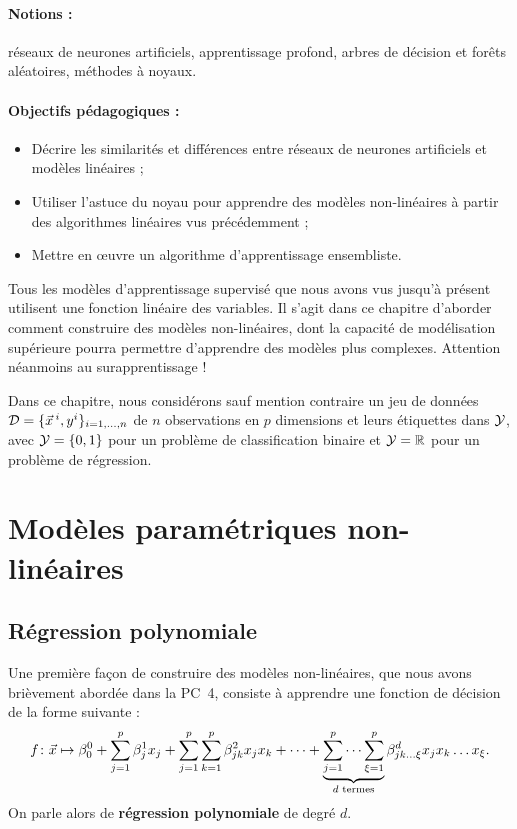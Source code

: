 \label{chap:nonlin}


\paragraph{Notions :} réseaux de neurones artificiels, apprentissage profond,
arbres de décision et forêts aléatoires, méthodes à noyaux.
\paragraph{Objectifs pédagogiques :} 
\begin{itemize}      
  \setlength{\itemsep}{3pt}
\item Décrire les similarités et différences entre réseaux de neurones artificiels et modèles linéaires ; 
\item Utiliser l'astuce du noyau pour apprendre des modèles non-linéaires à
  partir des algorithmes linéaires vus précédemment ;
\item Mettre en \oe{}uvre un algorithme d'apprentissage ensembliste.
\end{itemize}

Tous les modèles d'apprentissage supervisé que nous avons vus jusqu'à présent
utilisent une fonction linéaire des variables. Il s'agit dans ce chapitre
d'aborder comment construire des modèles non-linéaires, dont la capacité de
modélisation supérieure pourra permettre d'apprendre des modèles plus complexes. Attention néanmoins au surapprentissage !

Dans ce chapitre, nous considérons sauf mention contraire un jeu de données
$\DD = \{\xx^i, y^i\}_{i=1, \dots, n}$ de $n$ observations en $p$ dimensions et
leurs étiquettes dans $\mathcal{Y}$, avec $\mathcal{Y}= \{0, 1\}$ pour un problème de
classification binaire et $\mathcal{Y} = \mathbb{R}$ pour un problème de régression.

\section{Modèles paramétriques non-linéaires}

\subsection{Régression polynomiale}
\label{sec:polynomial_reg}
Une première façon de construire des modèles non-linéaires, que nous avons
brièvement abordée dans la PC~4, consiste à apprendre une fonction de
décision de la forme suivante :
\begin{equation}
  \label{eq:polynomial_decision}
  f\colon \xx \mapsto \beta^0_0 + \sum_{j=1}^p \beta^1_{j} x_j + 
  \sum_{j=1}^p \sum_{k=1}^p \beta^2_{jk} x_j x_k + \dots +
  \underbrace{\sum_{j=1}^p \dots \sum_{\xi=1}^p}_{d \text{ termes}} \beta^d_{jk\dots\xi} x_j x_k \dots x_{\xi}.
\end{equation}
On parle alors de \textbf{régression polynomiale} de degré $d$.

